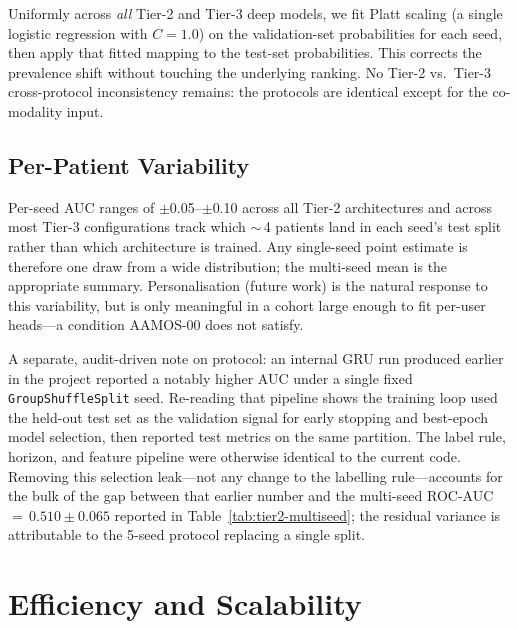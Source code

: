 \documentclass[11pt,a4paper]{article}
\begin{document}
Uniformly across \emph{all} Tier-2 and Tier-3 deep models, we fit Platt
scaling (a single logistic regression with $C{=}1.0$) on the validation-set
probabilities for each seed, then apply that fitted mapping to the
test-set probabilities.  This corrects the prevalence shift without
touching the underlying ranking.  No Tier-2 vs.\ Tier-3 cross-protocol
inconsistency remains: the protocols are identical except for the
co-modality input.

\subsection{Per-Patient Variability}

Per-seed AUC ranges of $\pm$0.05--$\pm$0.10 across all Tier-2 architectures
and across most Tier-3 configurations track which $\sim$\,4 patients land
in each seed's test split rather than which architecture is trained.  Any
single-seed point estimate is therefore one draw from a wide distribution;
the multi-seed mean is the appropriate summary.  Personalisation (future
work) is the natural response to this variability, but is only meaningful
in a cohort large enough to fit per-user heads---a condition AAMOS-00
does not satisfy.

A separate, audit-driven note on protocol: an internal GRU run produced
earlier in the project reported a notably higher AUC under a single fixed
\texttt{GroupShuffleSplit} seed.  Re-reading that pipeline shows the
training loop used the held-out test set as the validation signal for
early stopping and best-epoch model selection, then reported test metrics
on the same partition.  The label rule, horizon, and feature pipeline
were otherwise identical to the current code.  Removing this selection
leak---not any change to the labelling rule---accounts for the bulk of
the gap between that earlier number and the multi-seed
ROC-AUC\,$=\,0.510\pm0.065$ reported in Table~\ref{tab:tier2-multiseed};
the residual variance is attributable to the 5-seed protocol replacing a
single split.

\section{Efficiency and Scalability}\label{sec:efficiency}
\end{document}
